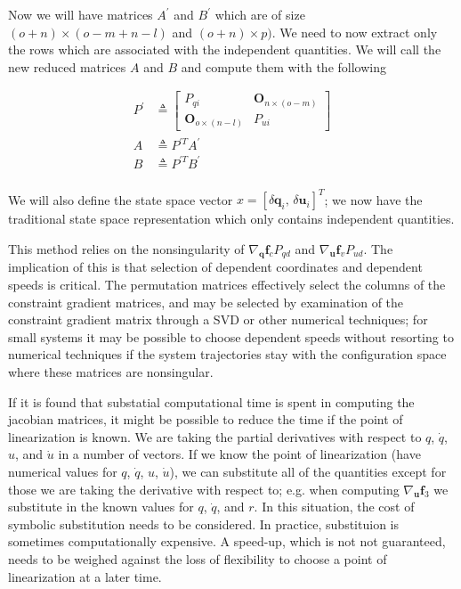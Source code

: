 \documentclass{svjour3}                     %
\begin{document}
Now we will have matrices $A^\prime$ and $B^\prime$ which are of size $(o +
n) \times (o - m + n - l)$ and $(o + n) \times p)$. We need to now extract only
the rows which are associated with the independent quantities. We will call the
new reduced matrices $A$ and $B$ and compute them with the following

\begin{align}
    P^\prime &\triangleq \begin{bmatrix}
        P_{qi} & \bm{O}_{n \times (o - m)} \\
        \bm{O}_{o \times (n - l)} & P_{ui}
    \end{bmatrix} \\
    A &\triangleq P^{\prime T} A^\prime \\
    B &\triangleq P^{\prime T} B^\prime \\
\end{align}

We will also define the state space vector $x =
\left[\delta\bm{q}_i,\,\delta\bm{u}_i\right]^{T}$; we now have the traditional
state space representation which only contains independent quantities.

This method relies on the nonsingularity of $\nabla_{\bm{q}}\bm{f}_{c} P_{qd}$
and $\nabla_{\bm{u}} \bm{f}_{v} P_{ud}$.  The implication of this is that
selection of dependent coordinates and dependent speeds is critical.  The
permutation matrices effectively select the columns of the constraint gradient
matrices, and may be selected by examination of the constraint gradient matrix
through a SVD or other numerical techniques; for small systems it may be
possible to choose dependent speeds without resorting to numerical techniques
if the system trajectories stay with the configuration space where these
matrices are nonsingular.

If it is found that substatial computational time is spent in computing the
jacobian matrices, it might be possible to reduce the time if the point of
linearization is known. We are taking the partial derivatives with respect to
$q$, $\dot{q}$, $u$, and $\dot{u}$ in a number of vectors. If we know the point
of linearization (have numerical values for $q$, $\dot{q}$, $u$, $\dot{u}$), we
can substitute all of the quantities except for those we are taking the
derivative with respect to; e.g. when computing $\nabla_{\bm{u}} \bm{f}_3$ we
substitute in the known values for $q$, $\dot{q}$, and $r$. In this situation,
the cost of symbolic substitution needs to be considered. In practice,
substituion is sometimes computationally expensive. A speed-up, which is not
not guaranteed, needs to be weighed against the loss of flexibility to choose a
point of linearization at a later time.
\end{document}
